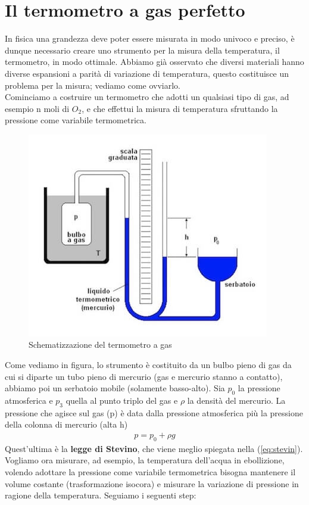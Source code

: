 \documentclass[10pt,a4paper]{article}
\begin{document}
\section{Il termometro a gas perfetto}
In fisica una grandezza deve poter essere misurata in modo univoco e preciso, è dunque necessario creare uno strumento per la misura della temperatura, il termometro, in modo ottimale. Abbiamo già osservato che diversi materiali hanno diverse espansioni a parità di variazione di temperatura, questo costituisce un problema per la misura; vediamo come ovviarlo.\\
Cominciamo a costruire un termometro che adotti un qualsiasi tipo di gas, ad esempio n moli di $O_2$, e che effettui la misura di temperatura sfruttando la pressione come variabile termometrica.
\begin{figure}[h!]
	\centering
	\includegraphics[width=0.6\linewidth]{termometro-a-gas}
	\caption{Schematizzazione del termometro a gas}
	\label{fig:termometro-a-gas}
\end{figure}
\FloatBarrier
Come vediamo in figura, lo strumento è costituito da un bulbo pieno di gas da cui si diparte un tubo pieno di mercurio (gas e mercurio stanno a contatto), abbiamo poi un serbatoio mobile (solamente basso-alto). Sia $p_0$ la pressione atmosferica e $p_3$ quella al punto triplo del gas e $\rho$ la densità del mercurio. La pressione che agisce sul gas (p) è data dalla pressione atmosferica più la pressione della colonna di mercurio (alta h)
\begin{align*}
	p = p_0 + \rho g
\end{align*}
Quest'ultima è la \textbf{legge di Stevino}, che viene meglio spiegata nella (\ref{eq:stevin}).\\
Vogliamo ora misurare, ad esempio, la temperatura dell'acqua in ebollizione, volendo adottare la pressione come variabile termometrica bisogna mantenere il volume costante (trasformazione isocora) e misurare la variazione di pressione in ragione della temperatura. Seguiamo i seguenti step:
\end{document}
